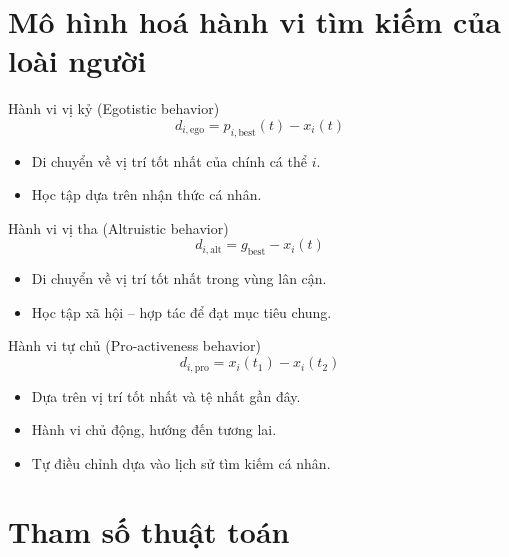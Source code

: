 \documentclass[10pt]{beamer}
\begin{document}
\section*{Mô hình hoá hành vi tìm kiếm của loài người}

\begin{frame}{Hành vi vị kỷ (Egotistic behavior)}
\centering
\vspace{-1em}
\[
d_{i,\text{ego}} = p_{i,\text{best}}(t) - x_i(t)
\]

\vspace{0.5em}
\begin{itemize}
    \item Di chuyển về vị trí tốt nhất của chính cá thể $i$.
    \item Học tập dựa trên nhận thức cá nhân.
\end{itemize}
\end{frame}

\begin{frame}{Hành vi vị tha (Altruistic behavior)}
\centering
\vspace{-1em}
\[
d_{i,\text{alt}} = g_{\text{best}} - x_i(t)
\]

\vspace{0.5em}
\begin{itemize}
    \item Di chuyển về vị trí tốt nhất trong vùng lân cận.
    \item Học tập xã hội – hợp tác để đạt mục tiêu chung.
\end{itemize}
\end{frame}

\begin{frame}{Hành vi tự chủ (Pro-activeness behavior)}
\centering
\vspace{-1em}
\[
d_{i,\text{pro}} = x_i(t_1) - x_i(t_2)
\]

\vspace{0.5em}
\begin{itemize}
    \item Dựa trên vị trí tốt nhất và tệ nhất gần đây.
    \item Hành vi chủ động, hướng đến tương lai.
    \item Tự điều chỉnh dựa vào lịch sử tìm kiếm cá nhân.
\end{itemize}
\end{frame}


\section*{Tham số thuật toán}
\end{document}
